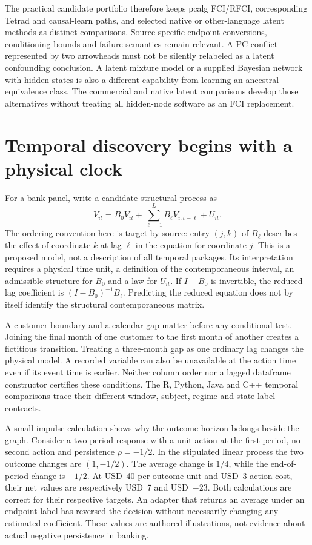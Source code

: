 The practical candidate portfolio therefore keeps pcalg FCI/RFCI, corresponding
Tetrad and causal-learn paths, and selected native or other-language latent
methods as distinct comparisons. Source-specific endpoint conversions,
conditioning bounds and failure semantics remain relevant. A PC conflict
represented by two arrowheads must not be silently relabeled as a latent
confounding conclusion. A latent mixture model or a supplied Bayesian network
with hidden states is also a different capability from learning an ancestral
equivalence class. The commercial and native latent comparisons develop
those alternatives without treating all hidden-node software as an FCI
replacement. \citep{exec13_pydisc_causallearn,exec13_latentr_primary,exec14_native_agrum,exec14_native_miic,exec13_latent_genie_structure,exec13_latent_mplus}

\section{Temporal discovery begins with a physical clock}

For a bank panel, write a candidate structural process as
\[
 V_{it}=B_0V_{it}+\sum_{\ell=1}^{L}B_\ell V_{i,t-\ell}+U_{it}.
\]
The ordering convention here is target by source: entry $(j,k)$ of $B_\ell$
describes the effect of coordinate $k$ at lag $\ell$ in the equation for
coordinate $j$. This is a proposed model, not a description of all temporal
packages. Its interpretation requires a physical time unit, a definition of
the contemporaneous interval, an admissible structure for $B_0$ and a law
for $U_{it}$. If $I-B_0$ is invertible, the reduced lag coefficient is
$(I-B_0)^{-1}B_\ell$. Predicting the reduced equation does not by itself
identify the structural contemporaneous matrix.

A customer boundary and a calendar gap matter before any conditional test.
Joining the final month of one customer to the first month of another creates
a fictitious transition. Treating a three-month gap as one ordinary lag
changes the physical model. A recorded variable can also be unavailable at
the action time even if its event time is earlier. Neither column order nor a
lagged dataframe constructor certifies these conditions. The R, Python, Java
and C++ temporal comparisons trace their different window, subject, regime
and state-label contracts. \citep{exec14_pt_contract,exec16_ct_pcalg,exec16_ct_agrum,exec16_ct_sdbn}

A small impulse calculation shows why the outcome horizon belongs beside the
graph. Consider a two-period response with a unit action at the first period,
no second action and persistence $\rho=-1/2$. In the stipulated linear process
the two outcome changes are $(1,-1/2)$. The average change is $1/4$, while
the end-of-period change is $-1/2$. At USD~40 per outcome unit and USD~3
action cost, their net values are respectively USD~7 and USD~$-23$.
Both calculations are correct for their respective targets. An adapter that
returns an average under an endpoint label has reversed the decision without
necessarily changing any estimated coefficient. These values are authored
illustrations, not evidence about actual negative persistence in banking.
\citep{exec16_s2_exact}

